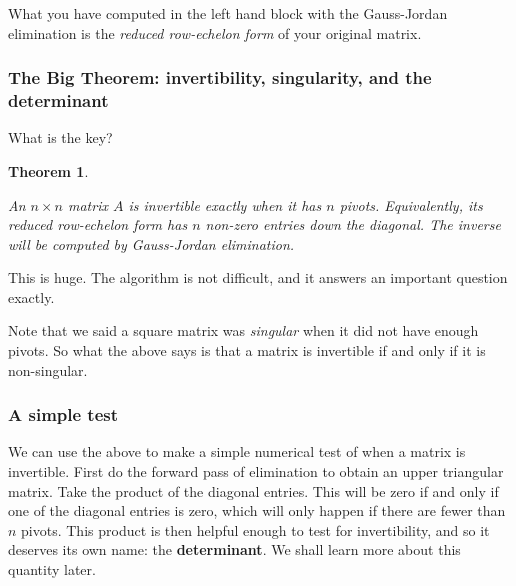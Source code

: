 \documentclass[10pt,]{book}
\newcommand{\terminology}[1]{\textbf{#1}}
\theoremstyle{plain}
\newtheorem{theorem}{Theorem}[chapter]
\numberwithin{equation}{section}
\begin{document}
        What you have computed in the left hand block with the Gauss-Jordan
        elimination is the \emph{reduced row-echelon form} of your original matrix.
\typeout{************************************************}
\typeout{************************************************}
\subsubsection[The Big Theorem: invertibility, singularity, and the determinant]{The Big Theorem: invertibility, singularity, and the determinant}\label{subsubsection-22}

        What is the key?
\begin{theorem}\label{theorem-1}

          An \(n\times n\) matrix \(A\) is invertible exactly when it has
          \(n\) pivots. Equivalently, its reduced row-echelon form has \(n\)
          non-zero entries down the diagonal. The inverse will be computed by
          Gauss-Jordan elimination.
        \end{theorem}
\par

        This is huge. The algorithm is not difficult, and it answers an
        important question exactly.
\par

        Note that we said a square matrix was \emph{singular} when it did not
        have enough pivots. So what the above says is that a matrix is invertible
        if and only if it is non-singular.
\typeout{************************************************}
\typeout{************************************************}
\subsubsection[A simple test]{A simple test}\label{subsubsection-23}

        We can use the above to make a simple numerical test of when a matrix is
        invertible. First do the forward pass of elimination to obtain an upper
        triangular matrix. Take the product of the diagonal entries. This will
        be zero if and only if one of the diagonal entries is zero, which will
        only happen if there are fewer than \(n\) pivots. This product is then
        helpful enough to test for invertibility, and so it deserves its own
        name: the \terminology{determinant}. We shall learn more about this quantity later.
\typeout{************************************************}
\typeout{************************************************}
\end{document}
